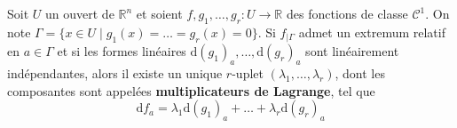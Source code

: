 






  \begin{theorem}
    Soit $U$ un ouvert de $\mathbb{R}^n$ et soient $f, g_1, \dots, g_r : U \rightarrow \mathbb{R}$ des fonctions de classe $\mathcal{C}^1$. On note $\Gamma = \{ x \in U \mid g_1(x) = \dots = g_r(x) = 0 \}$. Si $f_{|\Gamma}$ admet un extremum relatif en $a \in \Gamma$ et si les formes linéaires $\mathrm{d}(g_1)_a, \dots, \mathrm{d}(g_r)_a$ sont linéairement indépendantes, alors il existe un unique $r$-uplet $(\lambda_1, \dots, \lambda_r)$, dont les composantes sont appelées \textbf{multiplicateurs de Lagrange}, tel que
    \[ \mathrm{d}f_a = \lambda_1 \mathrm{d}(g_1)_a + \dots + \lambda_r \mathrm{d}(g_r)_a \]
  \end{theorem}


